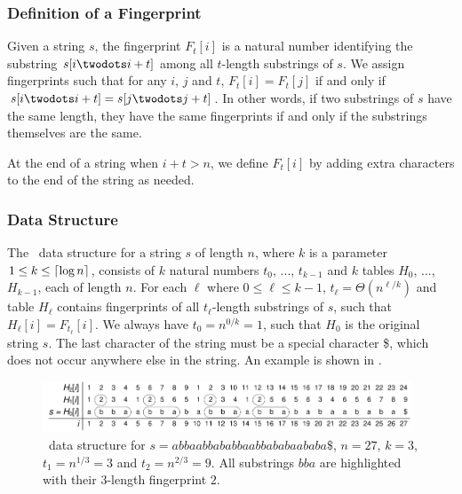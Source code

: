 \documentclass[a4]{article}
\newcommand*{\pref}{\prettyref}
\begin{document}
\subsubsection{Definition of a Fingerprint}

Given a string $s$, the fingerprint $F_t[i]$ is a natural number identifying the substring $s[i\twodots i+t]$ among all $t$-length substrings of $s$. We assign fingerprints such that for any $i$, $j$ and $t$, $F_t[i] = F_t[j]$ if and only if $s[i\twodots i+t] = s[j\twodots j+t]$. In other words, if two substrings of $s$ have the same length, they have the same fingerprints if and only if the substrings themselves are the same.

At the end of a string when $i+t>n$, we define $F_t[i]$ by adding extra characters to the end of the string as needed.

\subsubsection{Data Structure\label{sec:fingerprint-ds}}

The \fprintk\ data structure for a string $s$ of length $n$, where $k$ is a parameter $1 \leq k \leq \lceil\log n\rceil$, consists of $k$ natural numbers $t_0$, ..., $t_{k-1}$ and $k$ tables $H_0$, ..., $H_{k-1}$, each of length $n$. For each $\ell$ where $0\leq \ell\leq k-1$, $t_\ell = \Theta(n^{\ell/k})$ and table $H_\ell$ contains fingerprints of all $t_\ell$-length substrings of $s$, such that $H_\ell[i] = F_{t_\ell}[i]$. We always have $t_0 = n^{0/k} = 1$, such that $H_0$ is the original string $s$. The last character of the string must be a special character \$, which does not occur anywhere else in the string. An example is shown in \pref{fig:fingerprint-ds}.

\begin{figure}[tp]
    \begin{center}
        \includegraphics[width=0.98\textwidth,page=1]{fingerprint.pdf}
    \end{center}
    \caption{\label{fig:fingerprint-ds}\fprintk\ data structure for $s=\textit{abbaabbababbaabbababaababa\$}$, $n=27$, $k=3$, $t_1=n^{1/3}=3$ and $t_2=n^{2/3}=9$. All substrings $\textit{bba}$ are highlighted with their $3$-length fingerprint $2$.}
\end{figure}
\end{document}
